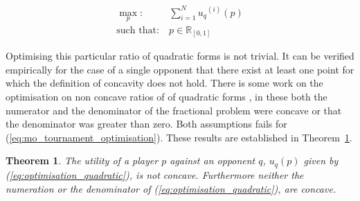 \documentclass[10pt]{article}
\newcommand{\R}{\mathbb{R}}
\newtheorem{theorem}{Theorem}
\begin{document}
\begin{equation}\label{eq:mo_tournament_optimisation}
    \begin{aligned}
    \max_p: & \ \sum_{i=1} ^ {N} {u_q}^{(i)} (p)
    \\
    \text{such that}: & \ p \in \R_{[0, 1]}
    \end{aligned}
\end{equation}

Optimising this particular ratio of quadratic forms is not trivial. It can be
verified empirically for the case of a single opponent that there exist at least
one point for which the definition of concavity does not hold. There is some
work on the optimisation on non concave ratios of of quadratic forms
\cite{Beck2009, Hongyan2014}, in these both the numerator and the denominator of
the fractional problem were concave or that the denominator was greater than
zero. Both assumptions fails for (\ref{eq:mo_tournament_optimisation}). These
results are established in Theorem~\ref{theorem:concavity}.

\begin{theorem}\label{theorem:concavity}
    The utility of a player \(p\) against an opponent \(q\), \(u_q (p)\) given by
    (\ref{eq:optimisation_quadratic}), is not concave. Furthermore neither the
    numeration or the denominator of (\ref{eq:optimisation_quadratic}), are concave.
\end{theorem}
\end{document}
